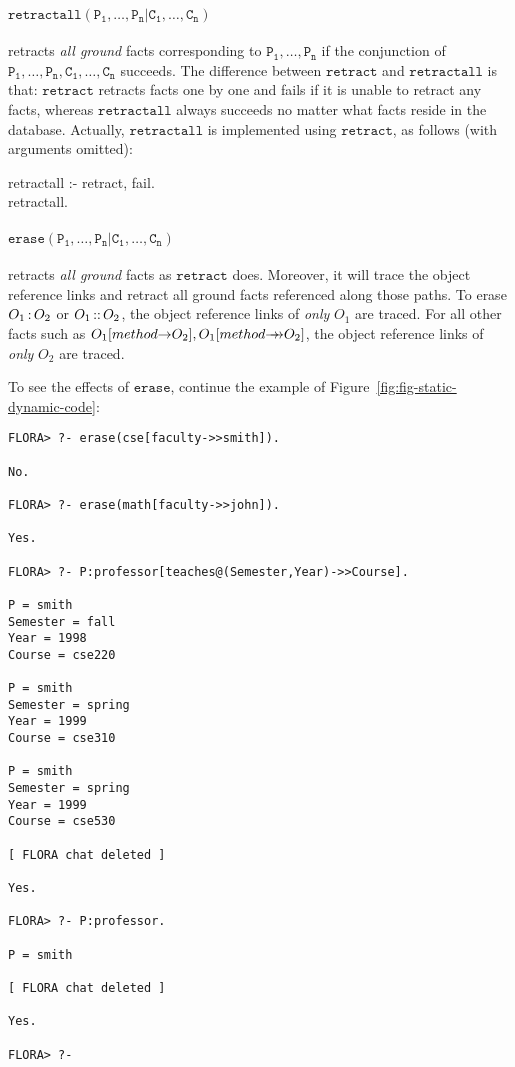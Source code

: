 \documentclass[11pt]{report}
\begin{document}
\paragraph{$\mathtt{retractall(P_1,\ldots,P_n | C_1,\ldots,C_n)}$} retracts \emph{all ground}
facts corresponding to $\mathtt{P_1,\ldots,P_n}$ if the conjunction of
$\mathtt{P_1,\ldots,P_n,C_1,\ldots,C_n}$ succeeds. The difference between $\mathtt{retract}$
and $\mathtt{retractall}$ is that: $\mathtt{retract}$ retracts facts one by one and fails
if it is unable to retract any facts, whereas $\mathtt{retractall}$ always succeeds no
matter what facts reside in the database. Actually, $\mathtt{retractall}$ is implemented
using $\mathtt{retract}$, as follows (with arguments omitted):
\begin{qrules}
retractall :- retract, fail. \\
retractall.
\end{qrules}

\paragraph{$\mathtt{erase(P_1,\ldots,P_n | C_1,\ldots,C_n)}$} retracts \emph{all ground} facts
as $\mathtt{retract}$ does. Moreover, it will trace the object reference links and retract
all ground facts referenced along those paths. To erase $O_1{\,{\bf{:}}\,}O_2$ or $O_1{\,{\bf{::}}\,}O_2$,
the object reference links of \emph{only} $O_1$ are traced. For all other \fl facts such as
$O_1[method{{\rightarrow}}O_2],O_1[method{{\rightarrow\!\!\!\!\rightarrow}}O_2]$, the object reference links of \emph{only} $O_2$
are traced. 

To see the effects of $\mathtt{erase}$, continue
the example of Figure~\ref{fig:fig-static-dynamic-code}:
\begin{verbatim}
FLORA> ?- erase(cse[faculty->>smith]).

No.

FLORA> ?- erase(math[faculty->>john]).

Yes.

FLORA> ?- P:professor[teaches@(Semester,Year)->>Course].

P = smith
Semester = fall
Year = 1998
Course = cse220

P = smith
Semester = spring
Year = 1999
Course = cse310

P = smith
Semester = spring
Year = 1999
Course = cse530

[ FLORA chat deleted ]

Yes.

FLORA> ?- P:professor.

P = smith

[ FLORA chat deleted ]

Yes.

FLORA> ?- 
\end{verbatim}
\end{document}
